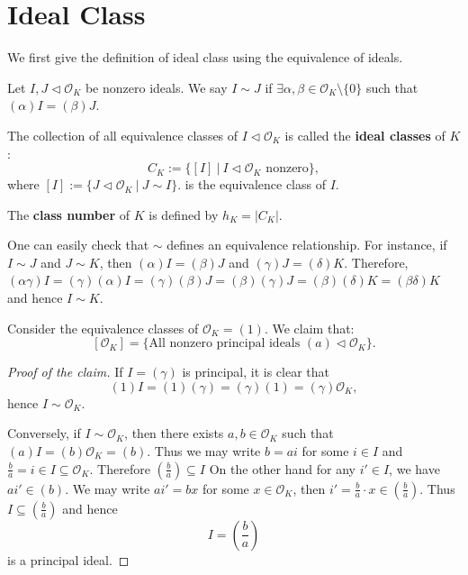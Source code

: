 \section{Ideal Class}
We first give the definition of ideal class using the equivalence of ideals.
\begin{definition}
    Let $I, J\lhd \mathcal{O}_{K}$ be nonzero ideals. We say $I\sim J$ if $\exists \alpha,\beta \in \mathcal{O}_{K}\setminus\{0\}$ such that $(\alpha)I=(\beta)J$. 

    The collection of all equivalence classes of $I\lhd \mathcal{O}_{K}$ is called the {\bf ideal classes} of $K$:
    \[
    C_{K}:=\{[I]\ |\ I\lhd \mathcal{O}_{K} \text{ nonzero}\},
    \]
    where 
    \(
    [I]:=\{J\lhd \mathcal{O}_{K}\ |\ J\sim I\}. 
    \) is the equivalence class of $I$.
\medskip

    The {\bf class number} of $K$ is defined by $h_{K}=\left| C_{K} \right| $.
\end{definition}
One can easily check that $\sim$ defines an equivalence relationship. For instance, if $I \sim J$ and $J \sim K$, then $(\alpha)I = (\beta)J$ and $(\gamma)J = (\delta)K$. Therefore,
    $(\alpha\gamma)I = (\gamma)(\alpha)I = (\gamma)(\beta)J = (\beta)(\gamma)J = (\beta)(\delta)K = (\beta\delta)K$
    and hence $I \sim K$.


\begin{example}
    Consider the equivalence classes of $\mathcal{O}_{K}=(1)$. We claim that:
    \[
    [\mathcal{O}_{K}]=\{\text{All nonzero principal ideals } (a)\lhd \mathcal{O}_{K}\}. 
    \]

    \begin{proof}[Proof of the claim]
        If $I=(\gamma)$ is principal, it is clear that 
        \[
        (1)I=(1)(\gamma)=(\gamma)(1)=(\gamma)\mathcal{O}_{K},
        \]
        hence $I\sim \mathcal{O}_{K}$. 

        Conversely, if $I\sim \mathcal{O}_{K}$, then there exists $a,b\in \mathcal{O}_{K}$ such that $(a)I=(b)\mathcal{O}_{K}=(b)$. Thus we may write $b=ai$ for some $i\in I$ and $\frac{b}{a}=i\in I\subseteq \mathcal{O}_{K}$. Therefore $(\frac{b}{a})\subseteq I$ On the other hand for any $i'\in I$, we have $ai'\in (b)$. We may write $ai'=bx$ for some $x\in \mathcal{O}_{K}$, then $i'=\frac{b}{a}\cdot x\in (\frac{b}{a})$. Thus $I\subseteq (\frac{b}{a})$ and hence
        $$I = (\frac{b}{a})$$
        is a principal ideal.
    \end{proof}
\end{example}


